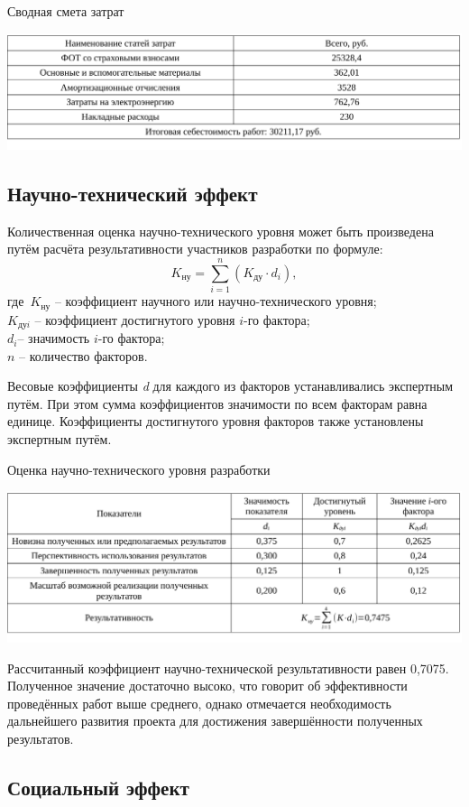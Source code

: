 \begin{table}[!ht]
\caption{Сводная смета затрат}
\centering
\includegraphics[page=1, width=1\linewidth]{econom_4.pdf}
\label{tab:eco_9}
\end{table}

\subsection{Научно-технический эффект}
Количественная оценка научно-технического уровня может быть произведена путём расчёта результативности участников разработки по формуле:
$$K_{\textit{ну}} = \sum_{i=1}^{n}(K_{\textit{ду}}\cdot d_{i}),$$
где\ $K_\textit{ну}$ – коэффициент научного или научно-технического уровня;\\$K_\textit{дуi}$ – коэффициент достигнутого уровня $\textit{i}{}$-го фактора;\\$d_{i}$– значимость $i$-го фактора;\\$\textit{n}$ – количество факторов.

Весовые коэффициенты \textit{d} для каждого из факторов устанавливались экспертным путём. При этом сумма коэффициентов значимости по всем факторам равна единице. Коэффициенты достигнутого уровня факторов также установлены экспертным путём.

\begin{table}[!ht]
\caption{Оценка научно-технического уровня разработки}
\centering
\includegraphics[page=1, width=1\linewidth]{econom_5.pdf}
\label{tab:eco_10}
\end{table}
Рассчитанный коэффициент научно-технической результативности равен 0,7075. Полученное значение достаточно высоко, что говорит об эффективности проведённых работ выше среднего, однако отмечается необходимость дальнейшего развития проекта для достижения завершённости полученных результатов.

\subsection{Социальный эффект}



\clearpage